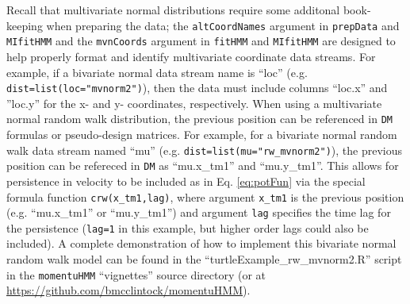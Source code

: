 \documentclass[12pt]{article}\usepackage[]{graphicx}\usepackage[]{color}
\begin{document}
Recall that multivariate normal distributions require some additonal book-keeping when preparing the data; the \verb|altCoordNames| argument in \verb|prepData| and \verb|MIfitHMM| and the \verb|mvnCoords| argument in \verb|fitHMM| and \verb|MIfitHMM| are designed to help properly format and identify multivariate coordinate data streams. For example, if a bivariate normal data stream name is ``loc'' (e.g. \verb|dist=list(loc="mvnorm2")|), then the data must include columns ``loc.x'' and ''loc.y'' for the x- and y- coordinates, respectively.  When using a multivariate normal random walk distribution, the previous position can be referenced in \verb|DM| formulas or pseudo-design matrices. For example, for a bivariate normal random walk data stream named ``mu'' (e.g. \verb|dist=list(mu="rw_mvnorm2")|), the previous position can be refereced in \verb|DM| as ``mu.x\_tm1'' and ``mu.y\_tm1''. This allows for persistence in velocity to be included as in Eq. \ref{eq:potFun} via the special formula function \verb|crw(x_tm1,lag)|, where argument \verb|x_tm1| is the previous position (e.g. ``mu.x\_tm1'' or ``mu.y\_tm1'') and argument \verb|lag| specifies the time lag for the persistence (\verb|lag=1| in this example, but higher order lags could also be included). A complete demonstration of how to implement this bivariate normal random walk model can be found in the ``turtleExample\_rw\_mvnorm2.R'' script in the \verb|momentuHMM| ``vignettes'' source directory (or at \url{https://github.com/bmcclintock/momentuHMM}).
\end{document}
